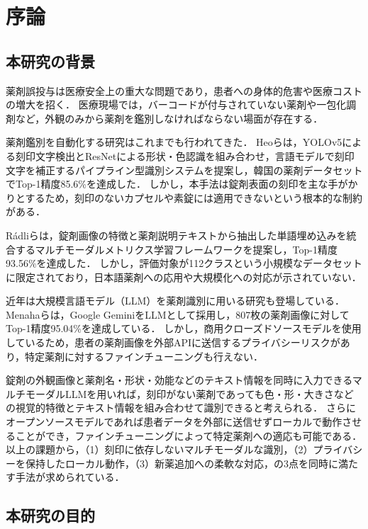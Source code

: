 \documentclass{ltjsarticle}
\begin{document}
\section{序論}\label{sec1}
\subsection{本研究の背景}

薬剤誤投与は医療安全上の重大な問題であり，患者への身体的危害や医療コストの増大を招く．
医療現場では，バーコードが付与されていない薬剤や一包化調剤など，外観のみから薬剤を鑑別しなければならない場面が存在する．

薬剤鑑別を自動化する研究はこれまでも行われてきた．
Heoら\cite{heo2023pill}は，YOLOv5による刻印文字検出とResNetによる形状・色認識を組み合わせ，言語モデルで刻印文字を補正するパイプライン型識別システムを提案し，韓国の薬剤データセットでTop-1精度85.6\%を達成した．
しかし，本手法は錠剤表面の刻印を主な手がかりとするため，刻印のないカプセルや素錠には適用できないという根本的な制約がある．

Rádliら\cite{radli2024metric}は，錠剤画像の特徴と薬剤説明テキストから抽出した単語埋め込みを統合するマルチモーダルメトリクス学習フレームワークを提案し，Top-1精度93.56\%を達成した．
しかし，評価対象が112クラスという小規模なデータセットに限定されており，日本語薬剤への応用や大規模化への対応が示されていない．

近年は大規模言語モデル（LLM）を薬剤識別に用いる研究も登場している．
Menahaら\cite{gemini2024pill}は，Google GeminiをLLMとして採用し，807枚の薬剤画像に対してTop-1精度95.04\%を達成している．
しかし，商用クローズドソースモデルを使用しているため，患者の薬剤画像を外部APIに送信するプライバシーリスクがあり，特定薬剤に対するファインチューニングも行えない．

錠剤の外観画像と薬剤名・形状・効能などのテキスト情報を同時に入力できるマルチモーダルLLMを用いれば，刻印がない薬剤であっても色・形・大きさなどの視覚的特徴とテキスト情報を組み合わせて識別できると考えられる．
さらにオープンソースモデルであれば患者データを外部に送信せずローカルで動作させることができ，ファインチューニングによって特定薬剤への適応も可能である．
以上の課題から，（1）刻印に依存しないマルチモーダルな識別，（2）プライバシーを保持したローカル動作，（3）新薬追加への柔軟な対応，の3点を同時に満たす手法が求められている．

\subsection{本研究の目的}
\end{document}

